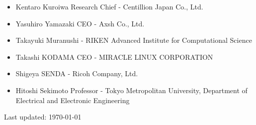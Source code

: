 \documentclass[letterpaper]{article}
\def\footer{
  \begin{center}
    \begin{footnotesize}
      Last updated: \today
    \end{footnotesize}
  \end{center}
}
\begin{document}
\begin{itemize}
  \item Kentaro Kuroiwa Research Chief - Centillion Japan Co., Ltd.
  \item Yasuhiro Yamazaki CEO - Axsh Co., Ltd.
  \item Takayuki Muranushi - RIKEN Advanced Institute for Computational Science
  \item Takashi KODAMA CEO - MIRACLE LINUX CORPORATION
  \item Shigeya SENDA - Ricoh Company, Ltd.
  \item Hitoshi Sekimoto Professor - Tokyo Metropolitan University, Department of Electrical and Electronic Engineering
\end{itemize}

\bigskip
\footer
\end{document}
